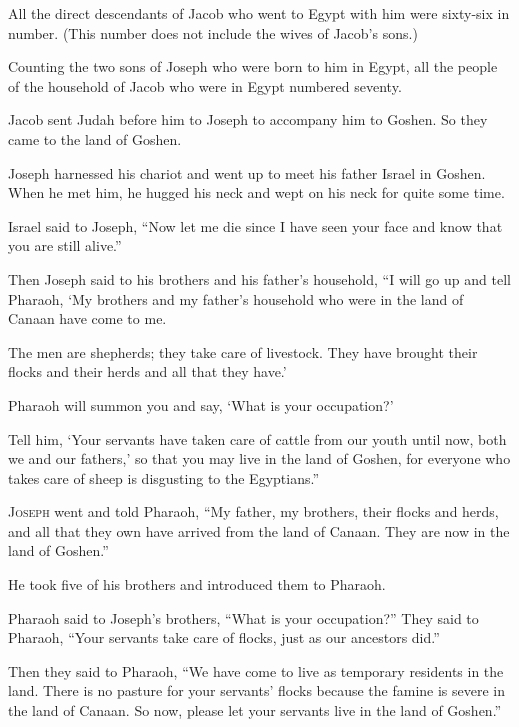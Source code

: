 \begin{scripture}
 All the direct descendants of Jacob who went to Egypt with him were sixty-six in number. (This number does not include the wives of Jacob's sons.)
 Counting the two sons of Joseph who were born to him in Egypt, all the people of the household of Jacob who were in Egypt numbered seventy.
\everypar{}

 Jacob sent Judah before him to Joseph to accompany him to Goshen. So they came to the land of Goshen.
 Joseph harnessed his chariot and went up to meet his father Israel in Goshen. When he met him, he hugged his neck and wept on his neck for quite some time.
\everypar{}

 Israel said to Joseph, ``Now let me die since I have seen your face and know that you are still alive.''
 Then Joseph said to his brothers and his father's household, ``I will go up and tell Pharaoh, `My brothers and my father's household who were in the land of Canaan have come to me.
 The men are shepherds; they take care of livestock. They have brought their flocks and their herds and all that they have.'
 Pharaoh will summon you and say, `What is your occupation?'
 Tell him, `Your servants have taken care of cattle from our youth until now, both we and our fathers,' so that you may live in the land of Goshen, for everyone who takes care of sheep is disgusting to the Egyptians.''

 \allowchapbreak\hypertarget{ch-genesis-47}{}\lettrine[lines=5]{\color{pentateuch}J}{\textsc{oseph}} went and told Pharaoh, ``My father, my brothers, their flocks and herds, and all that they own have arrived from the land of Canaan. They are now in the land of Goshen.''\everypar{}
 He took five of his brothers and introduced them to Pharaoh.
\\\indent{} Pharaoh said to Joseph's brothers, ``What is your occupation?'' They said to Pharaoh, ``Your servants take care of flocks, just as our ancestors did.''
 Then they said to Pharaoh, ``We have come to live as temporary residents in the land. There is no pasture for your servants' flocks because the famine is severe in the land of Canaan. So now, please let your servants live in the land of Goshen.''
\everypar{}


\end{scripture}
